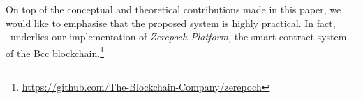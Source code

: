 On top of the conceptual and theoretical contributions made in this paper, we would like to emphasise that the proposed system is highly practical. In fact, \EUTXOma\ underlies our implementation of \emph{Zerepoch Platform,} the smart contract system of the Bcc blockchain.\footnote{\url{https://github.com/The-Blockchain-Company/zerepoch}}

